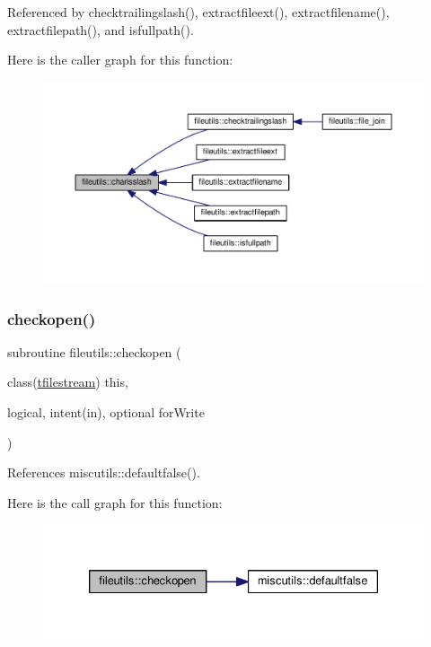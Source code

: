 Referenced by checktrailingslash(), extractfileext(), extractfilename(), extractfilepath(), and isfullpath().

Here is the caller graph for this function\+:
\nopagebreak
\begin{figure}[H]
\begin{center}
\leavevmode
\includegraphics[width=350pt]{namespacefileutils_a325f66a61f2de7872003adf25ec2bfbd_icgraph}
\end{center}
\end{figure}
\mbox{\label{namespacefileutils_af19fea352f8dfa2014baece1a62940f4}} 
\subsubsection{\texorpdfstring{checkopen()}{checkopen()}}
{\footnotesize\ttfamily subroutine fileutils\+::checkopen (\begin{DoxyParamCaption}\item[{class(\mbox{\hyperlink{structfileutils_1_1tfilestream}{tfilestream}})}]{this,  }\item[{logical, intent(in), optional}]{for\+Write }\end{DoxyParamCaption})\hspace{0.3cm}{\ttfamily [private]}}



References miscutils\+::defaultfalse().

Here is the call graph for this function\+:
\nopagebreak
\begin{figure}[H]
\begin{center}
\leavevmode
\includegraphics[width=330pt]{namespacefileutils_af19fea352f8dfa2014baece1a62940f4_cgraph}
\end{center}
\end{figure}
\mbox{\label{namespacefileutils_a61ab2a304f35a84f39731548b11393a2}} 
